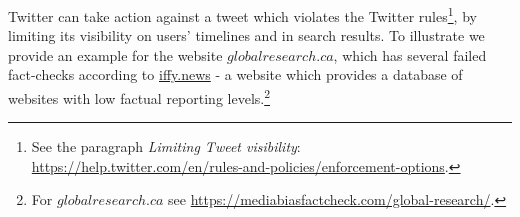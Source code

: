 \documentclass[11pt,a4paper]{article}
\begin{document}
Twitter can take action against a tweet which violates the Twitter rules\footnote{See the paragraph {\it Limiting Tweet visibility}: \href{https://help.twitter.com/en/rules-and-policies/enforcement-options}{https://help.twitter.com/en/rules-and-policies/enforcement-options}.}, by limiting its visibility on users' timelines and in search results. To illustrate we provide an example for the website $globalresearch.ca$, which has several failed fact-checks according to \href{https://iffy.news}{iffy.news} - a website which provides a database of websites with low factual reporting levels.\footnote{For $globalresearch.ca$ see \href{https://mediabiasfactcheck.com/global-research/}{https://mediabiasfactcheck.com/global-research/}.}

\smallskip

\end{document}
